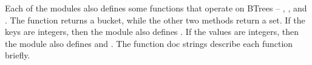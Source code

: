Each of the modules also defines some functions that operate on
BTrees -- , , and
.  The  function returns
a bucket, while the other two methods return a set.
If the keys are integers, then the module also defines
.  If the values are integers, then the module
also defines  and
.  The function doc strings describe each
function briefly.

